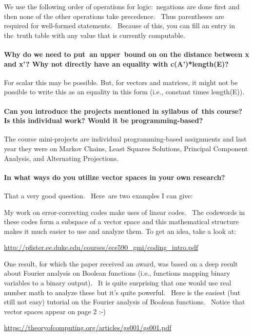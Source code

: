 \documentclass[10pt,english]{article}
\begin{document}
We use the following order of operations for logic: negations are done first and then none of the other operations take precedence.  Thus parentheses are required for well-formed statements.  Because of this, you can fill an entry in the truth table with any value that is currently computable.

\paragraph{Why do we need to put an upper bound on on the distance between x and x'? Why not directly have an equality with c(A')*length(E)?}

For scalar this may be possible.  But, for vectors and matrices, it might not be possible to write this as an equality in this form (i.e., constant times length(E)).

\paragraph{Can you introduce the projects mentioned in syllabus of this course? Is this individual work? Would it be programming-based?}

The course mini-projects are individual programming-based assignments and last year they were on
Markov Chains,
Least Squares Solutions,
Principal Component Analysis, and
Alternating Projections.


\paragraph{In what ways do you utilize vector spaces in your own research?}

That a very good question.  Here are two examples I can give:

My work on error-correcting codes make uses of linear codes.  The codewords in these codes form a subspace of a vector space and this mathematical structure makes it much easier to use and analyze them. To get an idea, take a look at:
\begin{center}
\url{http://pfister.ee.duke.edu/courses/ece590_gmi/coding_intro.pdf}
\end{center}

One result, for which the paper received an award, was based on a deep result about Fourier analysis on Boolean functions (i.e., functions mapping binary variables to a binary output).  It is quite surprising that one would use real number math to analyze these but it's quite powerful.  Here is the easiest (but still not easy) tutorial on the Fourier analysis of Boolean functions.  Notice that vector spaces appear on page 2 :-)
\begin{center}
\url{https://theoryofcomputing.org/articles/gs001/gs001.pdf}
\end{center}
\end{document}

